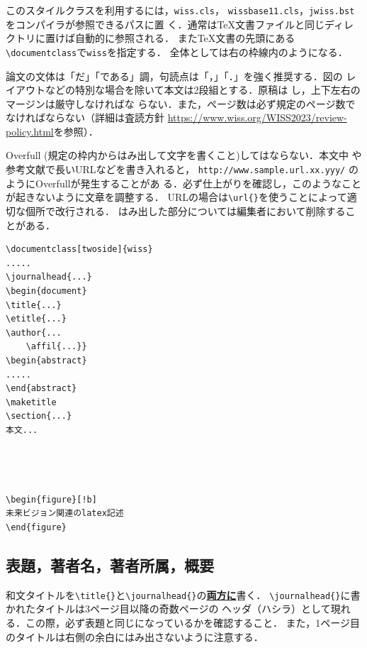 \documentclass[twoside]{wiss}
\begin{document}
このスタイルクラスを利用するには，\verb|wiss.cls|，
\verb|wissbase11.cls|，\verb|jwiss.bst|をコンパイラが参照できるパスに置
く．通常は\TeX 文書ファイルと同じディレクトリに置けば自動的に参照される．
また\TeX 文書の先頭にある\verb|\documentclass|で\verb|wiss|を指定する．
全体としては右の枠線内のようになる．

論文の文体は「だ」「である」調，句読点は「，」「．」を強く推奨する．図の
レイアウトなどの特別な場合を除いて本文は2段組とする．原稿は
し，上下左右のマージンは厳守しなければな
らない．また，ページ数は必ず規定のページ数でなければならない（詳細は査読方針 \url{https://www.wiss.org/WISS2023/review-policy.html}を参照）．

Overfull (規定の枠内からはみ出して文字を書くこと)してはならない．本文中
や参考文献で長いURLなどを書き入れると，
\verb|http://www.sample.url.xx.yyy/| のようにOverfullが発生することがあ
る．必ず仕上がりを確認し，このようなことが起きないように文章を調整する．
URLの場合は\verb|\url{}|を使うことによって適切な個所で改行される．
はみ出した部分については編集者において削除することがある．

\begin{screen}
\begin{verbatim}
\documentclass[twoside]{wiss}
.....
\journalhead{...}
\begin{document}
\title{...}
\etitle{...}
\author{...
    \affil{...}}
\begin{abstract}
.....
\end{abstract}
\maketitle
\section{...}
本文...




\begin{figure}[!b]
未来ビジョン関連のlatex記述
\end{figure}
\end{verbatim}
\end{screen}


\subsection{表題，著者名，著者所属，概要}

和文タイトルを\verb|\title{}|と\verb|\journalhead{}|の\underline{\textbf{両方に}}書く．
\verb|\journalhead{}|に書かれたタイトルは3ページ目以降の奇数ページの
ヘッダ（ハシラ）として現れる．この際，必ず表題と同じになっているかを確認すること．
また，1ページ目のタイトルは右側の余白にはみ出さないように注意する．
\end{document}
